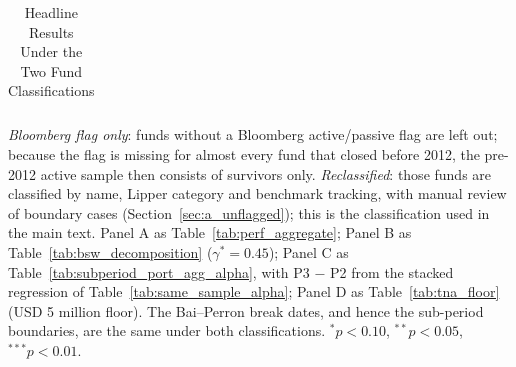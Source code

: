 \begin{table}[!htbp]
{\begin{tabular}{lcc}
\bottomrule
\end{tabular}%
}\sbefit
\setlength{\tabletempwidth}{\wd\tabletempbox}
\ifdim\tabletempwidth>\linewidth\setlength{\tabletempwidth}{\linewidth}\fi
\begin{minipage}{\tabletempwidth}
\captionsetup{width=\linewidth}
\caption{Headline Results Under the Two Fund Classifications}\label{tab:classification_robustness}
\ifdim\wd\tabletempbox>\linewidth
  \resizebox{\linewidth}{!}{\usebox{\tabletempbox}}
\else
  \usebox{\tabletempbox}
\fi
\par\medskip
\begin{singlespace}\tablefont\noindent
\textit{Bloomberg flag only}: funds without a Bloomberg active/passive flag are left out; because the flag is missing for almost every fund that closed before 2012, the pre-2012 active sample then consists of survivors only. \textit{Reclassified}: those funds are classified by name, Lipper category and benchmark tracking, with manual review of boundary cases (Section~\ref{sec:a_unflagged}); this is the classification used in the main text. Panel A as Table~\ref{tab:perf_aggregate}; Panel B as Table~\ref{tab:bsw_decomposition} ($\gamma^*=0.45$); Panel C as Table~\ref{tab:subperiod_port_agg_alpha}, with P3 $-$ P2 from the stacked regression of Table~\ref{tab:same_sample_alpha}; Panel D as Table~\ref{tab:tna_floor} (USD 5 million floor). The Bai--Perron break dates, and hence the sub-period boundaries, are the same under both classifications. $^{*}p<0.10$, $^{**}p<0.05$, $^{***}p<0.01$.
\end{singlespace}
\end{minipage}
\end{table}

